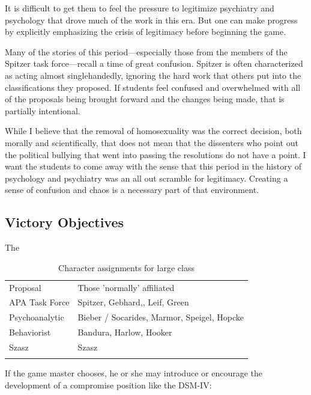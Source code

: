 It is difficult to get them to feel the pressure to legitimize psychiatry and psychology that drove much of the work in this era. But one can make progress by explicitly emphasizing the crisis of legitimacy before beginning the game.

Many of the stories of this period—especially those from the members of the Spitzer task force—recall a time of great confusion. Spitzer is often characterized as acting almost singlehandedly, ignoring the hard work that others put into the classifications they proposed. If students feel confused and overwhelmed with all of the proposals being brought forward and the changes being made, that is partially intentional. 

While I believe that the removal of homosexuality was the correct decision, both morally and scientifically, that does not mean that the dissenters who point out the political bullying that went into passing the resolutions do not have a point. I want the students to come away with the sense that this period in the history of psychology and psychiatry was an all out scramble for legitimacy. Creating a sense of confusion and chaos is a necessary part of that environment.

\subsection{Victory Objectives}
\label{victoryobjectives}

The
 \begin{longtable}[!t]{ | p{3cm} | p{3cm} |  }
\hline
Proposal&
Those 'normally' affiliated\\
APA Task Force&
Spitzer, Gebhard,, Leif, Green\\
Psychoanalytic&
Bieber / Socarides, Marmor, Speigel, Hopcke\\
Behaviorist&
Bandura, Harlow, Hooker\\
Szasz&
Szasz\\
\caption{Character assignments for large class}
\label{table: characterlarge}
\end{longtable}

If the game master chooses, he or she may introduce or encourage the development of a compromise position like the DSM-IV: 

